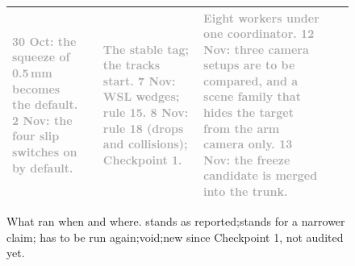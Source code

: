 \begin{figure}[H]
{\begin{tabularx}{\linewidth}{@{}>{\bfseries}p{0.95cm}*{5}{Y}@{}}
\textcolor{darkgray}{30 Oct: the squeeze of 0.5\,mm becomes the default. 2 Nov: the four slip switches on by default.} &
 &
\textcolor{darkgray}{The stable tag; the tracks start. 7 Nov: WSL wedges; rule 15. 8 Nov: rule 18 (drops and
collisions); Checkpoint 1.} &
\textcolor{darkgray}{Eight workers under one coordinator. 12 Nov: three camera setups are to be compared, and a
scene family that hides the target from the arm camera only. 13 Nov: the freeze candidate is merged into the
trunk.} \\
\bottomrule
\end{tabularx}}
\caption{What ran when and where. stands as reported;\quad {}stands for a narrower claim;\quad
{}has to be run again;\quad {}void;\quad {}new since Checkpoint 1, not audited yet.
}
\label{fig:timeline}
\end{figure}

